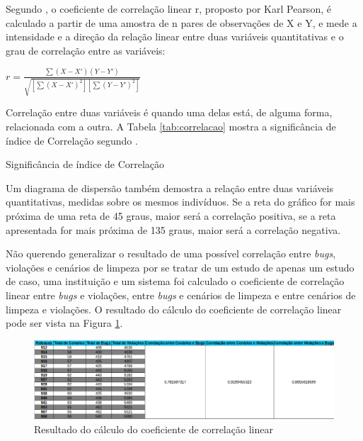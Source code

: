 Segundo \cite{Wasserman2010}, o coeficiente de correlação linear r, proposto por Karl Pearson, é calculado a partir de uma amostra de n pares de observações de X e Y, e mede a intensidade e a direção da relação linear entre duas variáveis quantitativas e o grau de correlação entre as variáveis:

$ r = \frac{\sum(X-X')(Y-Y')}{\sqrt{[\sum(X-X')^{2}][\sum(Y-Y')^{2}]}} $


Correlação entre duas variáveis é quando uma delas está, de alguma forma, relacionada com a outra. A Tabela \ref{tab:correlacao} mostra a significância de índice de Correlação segundo \cite{Wasserman2010}.

\begin{table}[!ht]
	\begin{center}
 
	\caption{Significância de índice de Correlação}
	\label{tab:correlacao}
	\end{center}
	\end{table}	
	\FloatBarrier

Um diagrama de dispersão também demostra a relação entre duas variáveis quantitativas, medidas sobre os mesmos indivíduos. Se a reta do gráfico for mais próxima de
uma reta de 45 graus, maior será a correlação positiva, se a reta apresentada for mais próxima de 135 graus, maior será a correlação negativa. 

Não querendo generalizar o resultado de uma possível correlação entre \textit{bugs}, violações e cenários de limpeza por se tratar de um estudo de apenas um estudo de caso, uma instituição e um sistema foi calculado o coeficiente de correlação linear entre \textit{bugs} e violações, entre \textit{bugs} e cenários de limpeza e entre cenários de limpeza e violações. O resultado do cálculo do coeficiente de correlação linear pode ser vista na Figura \ref{correlacao}.

\begin{figure}[h!]
\centering
\includegraphics[keepaspectratio=false,scale=0.40,angle=90]{figuras/figuras_nilton/correlacao.eps}
\caption{Resultado do cálculo do coeficiente de correlação linear}
\label{correlacao}
\end{figure}

